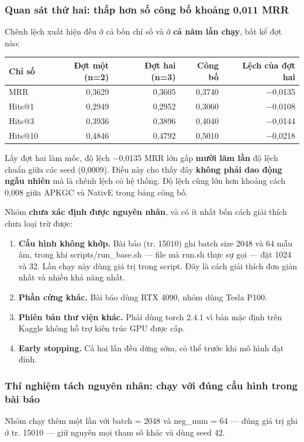 \documentclass[11pt,a4paper]{article}
\newcommand{\code}[1]{{\ttfamily\small\color{codetext}#1}}
\begin{document}
\subsubsection{Quan sát thứ hai: thấp hơn số công bố khoảng 0,011 MRR}
Chênh lệch xuất hiện đều ở cả bốn chỉ số và ở \textbf{cả năm lần chạy}, bất kể đợt nào:

\begin{center}\small
\begin{tabular}{@{}lrrrr@{}}
\toprule
\textbf{Chỉ số} & \textbf{Đợt một (n=2)} & \textbf{Đợt hai (n=3)} & \textbf{Công bố} & \textbf{Lệch của đợt hai}\\
\midrule
MRR & 0,3629 & 0,3605 & 0,3740 & −0,0135\\
Hits@1 & 0,2949 & 0,2952 & 0,3060 & −0,0108\\
Hits@3 & 0,3936 & 0,3896 & 0,4040 & −0,0144\\
Hits@10 & 0,4846 & 0,4792 & 0,5010 & −0,0218\\
\bottomrule
\end{tabular}
\end{center}
Lấy đợt hai làm mốc, độ lệch −0,0135 MRR lớn gấp \textbf{mười lăm lần} độ lệch chuẩn giữa các seed (0,0009). Điều này cho thấy đây \textbf{không phải dao động ngẫu nhiên} mà là chênh lệch có hệ thống. Độ lệch cũng lớn hơn khoảng cách 0,008 giữa APKGC và NativE trong bảng công bố.

Nhóm \textbf{chưa xác định được nguyên nhân}, và có ít nhất bốn cách giải thích chưa loại trừ được:

\begin{enumerate}\itemsep2pt
\item \textbf{Cấu hình không khớp.} Bài báo (tr. 15010) ghi batch size 2048 và 64 mẫu âm, trong khi \code{scripts/run\_base.sh} --- file mà \code{run.sh} thực sự gọi --- đặt 1024 và 32. Lần chạy này dùng giá trị trong script. Đây là cách giải thích đơn giản nhất và nhiều khả năng nhất.
\item \textbf{Phần cứng khác.} Bài báo dùng RTX 4090, nhóm dùng Tesla P100.
\item \textbf{Phiên bản thư viện khác.} Phải dùng torch 2.4.1 vì bản mặc định trên Kaggle không hỗ trợ kiến trúc GPU được cấp.
\item \textbf{Early stopping.} Cả hai lần đều dừng sớm, có thể trước khi mô hình đạt đỉnh.
\end{enumerate}
\subsubsection{Thí nghiệm tách nguyên nhân: chạy với đúng cấu hình trong bài báo}
Nhóm chạy thêm một lần với \code{batch = 2048} và \code{neg\_num = 64} --- đúng giá trị ghi ở tr. 15010 --- giữ nguyên mọi tham số khác và dùng seed 42.
\end{document}
